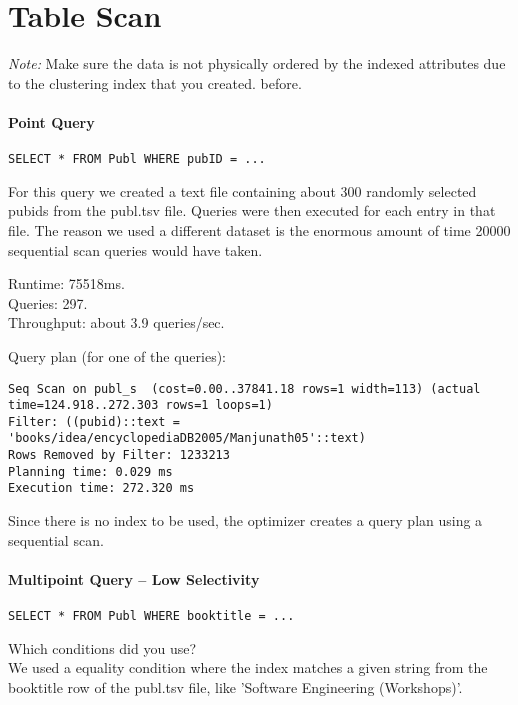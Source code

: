 \documentclass[11pt]{scrartcl}
\begin{document}
\section{Table Scan}

\noindent \emph{Note:} Make sure the data is not physically ordered by
the indexed attributes due to the clustering index that you created.
before.

\paragraph{Point Query}

{\small
\begin{verbatim}
SELECT * FROM Publ WHERE pubID = ...
\end{verbatim}
}

\noindent
For this query we created a text file containing about 300 randomly selected pubids from the publ.tsv file. Queries were then executed for each entry in that file. The reason we used a different dataset is the enormous amount of time 20000 sequential scan queries would have taken.

\smallskip\noindent
Runtime: 75518ms.\\
Queries: 297.\\
Throughput: about 3.9 queries/sec.

\smallskip\noindent
Query plan (for one of the queries):
{\small
\begin{verbatim}
Seq Scan on publ_s  (cost=0.00..37841.18 rows=1 width=113) (actual time=124.918..272.303 rows=1 loops=1)
Filter: ((pubid)::text = 'books/idea/encyclopediaDB2005/Manjunath05'::text)
Rows Removed by Filter: 1233213
Planning time: 0.029 ms
Execution time: 272.320 ms
\end{verbatim}
Since there is no index to be used, the optimizer creates a query plan using a sequential scan.
}


\paragraph{Multipoint Query -- Low Selectivity}

{\small
\begin{verbatim}
SELECT * FROM Publ WHERE booktitle = ...
\end{verbatim}
}

\noindent
Which conditions did you use?\\
We used a equality condition where the index matches a given string from the booktitle row of the publ.tsv file, like 'Software Engineering (Workshops)'.
\end{document}
